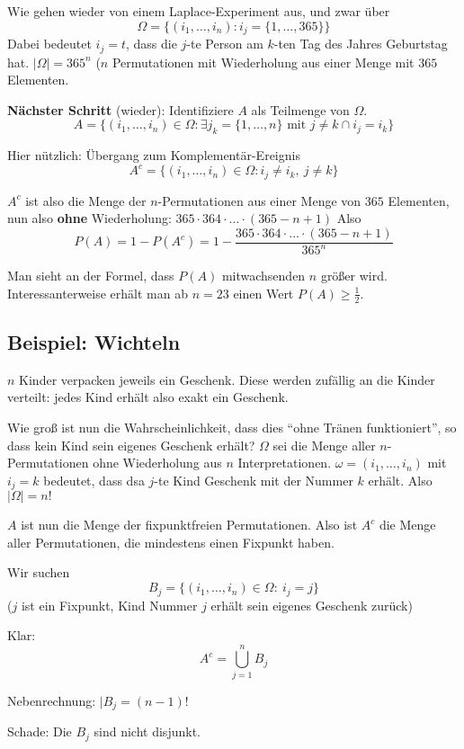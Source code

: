 Wie gehen wieder von einem Laplace-Experiment aus, und zwar über
\[ \Omega = \{ (i_1,\ldots,i_n) : i_j = \{ 1,\ldots,365 \} \} \]
Dabei bedeutet $i_j=t$, dass die $j$-te Person am $k$-ten Tag des Jahres Geburtstag hat.
$|\Omega| = 365^n$ ($n$ Permutationen mit Wiederholung aus einer Menge mit $365$ Elementen.

\textbf{Nächster Schritt} (wieder):
Identifiziere $A$ als Teilmenge von $\Omega$.
\[ A = \{ (i_1,\ldots,i_n) \in \Omega : \exists j_k=\{1,\ldots,n\}\text{ mit }j\neq k \cap i_j=i_k  \} \]

Hier nützlich: Übergang zum Komplementär-Ereignis
\[ A^c = \{ (i_1,\ldots,i_n) \in \Omega : i_j \neq i_k,\ j \neq k \}\]

$A^c$ ist also die Menge der $n$-Permutationen aus einer Menge von $365$ Elementen, nun also \textbf{ohne} Wiederholung:
$365 \cdot 364 \cdot \ldots \cdot (365 - n +1)$
Also
\[ P(A) = 1-P(A^c) = 1 - \frac{365 \cdot 364 \cdot \ldots \cdot (365 - n +1)}{365^n} \]

Man sieht an der Formel, dass $P(A)$ mitwachsenden $n$ größer wird.
Interessanterweise erhält man ab $n=23$ einen Wert $P(A) \geq \frac{1}{2}$.

\subsection{Beispiel: Wichteln}

$n$ Kinder verpacken jeweils ein Geschenk.
Diese werden zufällig an die Kinder verteilt: jedes Kind erhält also exakt ein Geschenk.

Wie groß ist nun die Wahrscheinlichkeit, dass dies ``ohne Tränen funktioniert'', so dass kein Kind sein eigenes Geschenk erhält?
$\Omega$ sei die Menge aller $n$-Permutationen ohne Wiederholung aus $n$ Interpretationen.
$\omega = (i_1,\ldots,i_n)$ mit $i_j=k$ bedeutet, dass dsa $j$-te Kind Geschenk mit der Nummer $k$ erhält.
Also $|\Omega| = n!$

$A$ ist nun die Menge der fixpunktfreien Permutationen. Also ist $A^c$ die Menge aller Permutationen, die mindestens einen Fixpunkt haben.

Wir suchen
\[ B_j = \{ (i_1,\ldots,i_n)\in \Omega:\ i_j=j \} \]
($j$ ist ein Fixpunkt, Kind Nummer $j$ erhält sein eigenes Geschenk zurück)

Klar: \[ A^c = \bigcup_{j=1}^n B_j \]

Nebenrechnung: $|B_j = (n-1)!$

Schade: Die $B_j$ sind nicht disjunkt.


